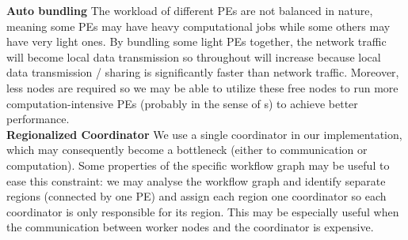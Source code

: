 \textbf{Auto bundling}\quad
The workload of different PEs are not balanced in nature, meaning some PEs may have heavy computational jobs while some others may have very light ones. By bundling some light PEs together, the network traffic will become local data transmission so throughout will increase because local data transmission / sharing is significantly faster than network traffic. Moreover, less nodes are required so we may be able to utilize these free nodes to run more computation-intensive PEs (probably in the sense of \tPEDup{}s) to achieve better performance. \\

\textbf{Regionalized Coordinator}\quad
We use a single coordinator in our implementation, which may consequently become a bottleneck (either to communication or computation). Some properties of the specific workflow graph may be useful to ease this constraint: we may analyse the workflow graph and identify separate regions (connected by one PE) and assign each region one coordinator so each coordinator is only responsible for its region. This may be especially useful when the communication between worker nodes and the coordinator is expensive.

